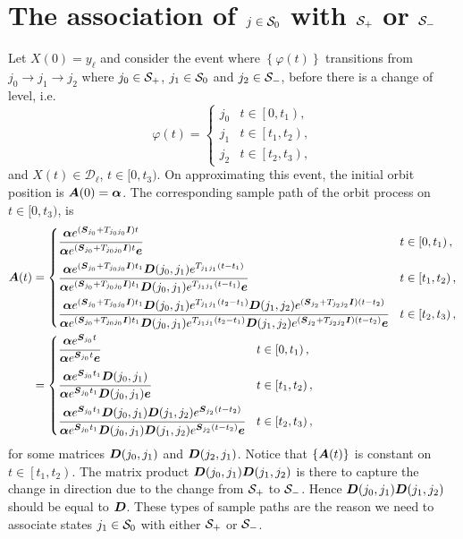 \section{The association of \(j\in\mathcal{S}_0\) with \(\mathcal{S}_+\) or \(\mathcal{S}_-\)}\label{sec: zero states}
Let \(X(0)=y_\ell\) and consider the event where \(\left\{\varphi(t)\right\}\) transitions from \(j_0\to j_1\to j_2\) where \(j_0\in\mathcal{S}_+\), \(j_1\in\mathcal{S}_0\) and \(j_2\in\mathcal{S}_-\), before there is a change of level, i.e.~
\[\varphi(t) = \begin{cases}
	j_0 & t\in\left[0,t_1\right), \\
	j_1 & t\in\left[t_1,t_2\right), \\
	j_2 & t\in\left[t_2,t_3\right),
\end{cases}\]
and \(X(t)\in\mathcal D_\ell\), \(t\in[0,t_3)\). 
On approximating this event, the initial orbit position is \(\boldsymbol A(0)=\boldsymbol \alpha\). The corresponding sample path of the orbit process on \(t\in[0,t_3)\), is 
\begin{align*}
\bs A(t) &= \begin{cases} 
	\cfrac{\bs \alpha e^{(\bs{S}_{j_0}+T_{{j_0}{j_0}}\bs{I})t}}{\bs \alpha e^{(\bs{S}_{j_0}+T_{{j_0}{j_0}}\bs{I})t}\bs e} & t\in\left[0,t_1\right), \\[10pt]
	\cfrac{\bs \alpha e^{(\bs{S}_{j_0}+T_{{j_0}{j_0}}\bs{I})t_1}\bs{D}({j_0},{j_1})e^{T_{{j_1}{j_1}}(t-t_1)}}{\bs \alpha e^{(\bs{S}_{j_0}+T_{{j_0}{j_0}}\bs{I})t_1}\bs{D}({j_0},{j_1})e^{T_{{j_1}{j_1}}(t-t_1)}\bs e} & t\in\left[t_1,t_2\right), \\[10pt]
	\cfrac{\bs \alpha e^{(\bs{S}_{j_0}+T_{{j_0}{j_0}}\bs{I})t_1}\bs{D}({j_0},{j_1})e^{T_{{j_1}{j_1}}(t_2-t_1)}\bs{D}({j_1},{j_2})e^{(\bs{S}_{j_2}+T_{{j_2}{j_2}}\bs{I})(t-t_2)}}{\bs \alpha e^{(\bs{S}_{j_0}+T_{{j_0}{j_0}}\bs{I})t_1}\bs{D}({j_0},{j_1})e^{T_{{j_1}{j_1}}(t_2-t_1)}\bs{D}({j_1},{j_2})e^{(\bs{S}_{j_2}+T_{{j_2}{j_2}}\bs{I})(t-t_2)}\bs e} & t\in\left[t_2,t_3\right),
\end{cases}
%
\\&= \begin{cases} 
	\cfrac{\bs \alpha e^{\bs{S}_{j_0}t}}{\bs \alpha e^{\bs{S}_{{j_0}}t}\bs e} & t\in\left[0,t_1\right), \\[10pt]
	\cfrac{\bs \alpha e^{\bs{S}_{j_0}t_1}\bs{D}({j_0},{j_1})}{\bs \alpha e^{\bs{S}_{j_0}t_1}\bs{D}({j_0},{j_1})\bs e} & t\in\left[t_1,t_2\right), \\[10pt] 
	\cfrac{\bs \alpha e^{\bs{S}_{j_0}t_1}\bs{D}({j_0},{j_1})\bs{D}({j_1},{j_2})e^{\bs{S}_{j_2}(t-t_2)}}{\bs \alpha e^{\bs{S}_{j_0}t_1}\bs{D}({j_0},{j_1})\bs{D}({j_1},{j_2})e^{\bs{S}_{j_2}(t-t_2)}\bs e} & t\in\left[t_2,t_3\right),
\end{cases}
\end{align*}
for some matrices \(\boldsymbol{D}({j_0},{j_1})\) and \(\boldsymbol{D}({j_2},{j_1})\). Notice that \(\left\{\boldsymbol A(t)\right\}\) is constant on \(t\in\left[t_1,t_2\right)\). The matrix product \(\boldsymbol{D}({j_0},{j_1})\boldsymbol{D}({j_1},{j_2})\) is there to capture the change in direction due to the change from \(\mathcal{S}_+\) to \(\mathcal{S}_-\). Hence \(\boldsymbol{D}({j_0},{j_1})\boldsymbol{D}({j_1},{j_2})\) should be equal to \(\boldsymbol{D}\). These types of sample paths are the reason we need to associate states \({j_1}\in\mathcal{S}_0\) with either \(\mathcal{S}_+\) or \(\mathcal{S}_-\).

